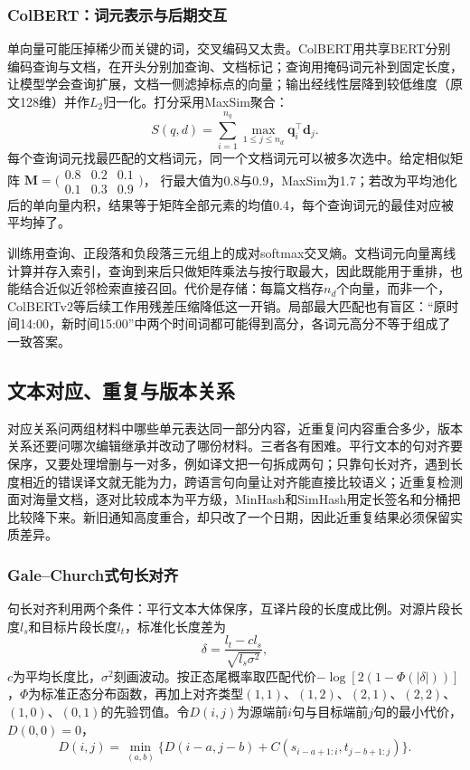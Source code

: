 \subsubsection{ColBERT：词元表示与后期交互}
\label{sec:nlp-classification-colbert}

单向量可能压掉稀少而关键的词，交叉编码又太贵。ColBERT用共享BERT分别编码查询与文档，在开头分别加查询、文档标记；查询用掩码词元补到固定长度，让模型学会查询扩展，文档一侧滤掉标点的向量；输出经线性层降到较低维度（原文128维）并作$L_2$归一化。打分采用MaxSim聚合：
\[
  S(q,d)=\sum_{i=1}^{n_q}\max_{1\le j\le n_d}\bm q_i^\top\bm d_j.
\]
每个查询词元找最匹配的文档词元，同一个文档词元可以被多次选中。给定相似矩阵
$\bm M=\bigl(\begin{smallmatrix}0.8&0.2&0.1\\0.1&0.3&0.9\end{smallmatrix}\bigr)$，
行最大值为0.8与0.9，MaxSim为1.7；若改为平均池化后的单向量内积，结果等于矩阵全部元素的均值0.4，每个查询词元的最佳对应被平均掉了。

训练用查询、正段落和负段落三元组上的成对softmax交叉熵。文档词元向量离线计算并存入索引，查询到来后只做矩阵乘法与按行取最大，因此既能用于重排，也能结合近似近邻检索直接召回。代价是存储：每篇文档存$n_d$个向量，而非一个，ColBERTv2等后续工作用残差压缩降低这一开销。局部最大匹配也有盲区：“原时间14:00，新时间15:00”中两个时间词都可能得到高分，各词元高分不等于组成了一致答案。

\subsection{文本对应、重复与版本关系}
\label{sec:nlp-classification-alignment-duplicates}

对应关系问两组材料中哪些单元表达同一部分内容，近重复问内容重合多少，版本关系还要问哪次编辑继承并改动了哪份材料。三者各有困难。平行文本的句对齐要保序，又要处理增删与一对多，例如译文把一句拆成两句；只靠句长对齐，遇到长度相近的错误译文就无能为力，跨语言句向量让对齐能直接比较语义；近重复检测面对海量文档，逐对比较成本为平方级，MinHash和SimHash用定长签名和分桶把比较降下来。新旧通知高度重合，却只改了一个日期，因此近重复结果必须保留实质差异。

\subsubsection{Gale--Church式句长对齐}
\label{sec:nlp-classification-galechurch}

句长对齐利用两个条件：平行文本大体保序，互译片段的长度成比例。对源片段长度$l_s$和目标片段长度$l_t$，标准化长度差为
\[
  \delta=\frac{l_t-cl_s}{\sqrt{l_s\sigma^2}},
\]
$c$为平均长度比，$\sigma^2$刻画波动。按正态尾概率取匹配代价$-\log[2(1-\Phi(|\delta|))]$，$\Phi$为标准正态分布函数，再加上对齐类型$(1,1)$、$(1,2)$、$(2,1)$、$(2,2)$、$(1,0)$、$(0,1)$的先验罚值。令$D(i,j)$为源端前$i$句与目标端前$j$句的最小代价，$D(0,0)=0$，
\[
 D(i,j)=\min_{(a,b)}\bigl\{D(i-a,j-b)+C(s_{i-a+1:i},t_{j-b+1:j})\bigr\}.
\]

